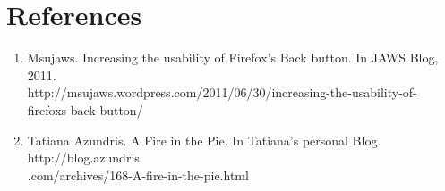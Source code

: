 \documentclass[a4paper,twoside,10pt]{article}
\begin{document}
\section*{References}
\begin{enumerate}
	 
\item Msujaws. Increasing the usability of Firefox’s Back button. In JAWS Blog, 2011.\\
http://msujaws.wordpress.com/2011/06/30/increasing-the-usability-of-firefoxs-back-button/

\item Tatiana Azundris. A Fire in the Pie. In Tatiana's personal Blog. http://blog.azundris\\
.com/archives/168-A-fire-in-the-pie.html \\

\end{enumerate}
\end{document}
